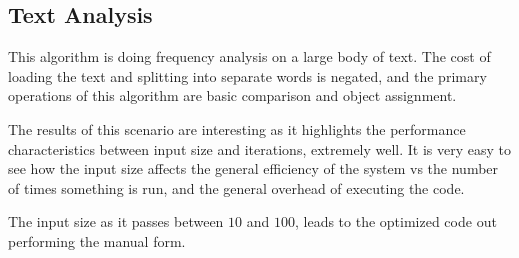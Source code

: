 \subsection{Text Analysis}
This algorithm is doing frequency analysis on a large body of text.  The cost of loading the text and splitting into separate words is negated, and the primary operations of this algorithm are basic comparison and object assignment. 

The results of this scenario are interesting as it highlights the performance characteristics between input size and iterations, extremely well.  It is very easy to see how the input size affects the general efficiency of the system vs the number of times something is run, and the general overhead of executing the code.

The input size as it passes between $10$ and $100$, leads to the optimized code out performing the manual form. 